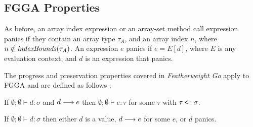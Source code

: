 


\subsection{FGGA Properties}

As before, an array index expression or an array-set method call expression
panics if they contain an array type $\tau_A$, and an array index $n$, where $n
    \notin \mathit{indexBounds}(\tau_A)$. An expression $e$ panics if $e = E[d]$, where $E$ is
any evaluation context, and $d$ is an expression that panics.

The progress and preservation properties covered in \emph{Featherweight Go}
apply to FGGA and are defined as follows \autocite{fg}:

\begin{theorem}[Preservation]
    If\/ $\emptyset;\emptyset \vdash d : \sigma$ and $d \longrightarrow e$
    then\/ $\emptyset;\emptyset \vdash e : \tau$ for some $\tau$
    with\/ $\tau \mathbin{\texttt{<:}} \sigma$.
\end{theorem}

\begin{theorem}[Progress]
    If\/ $\emptyset;\emptyset \vdash d:\sigma$ then
    either\/ $d$ is a value,
    $d \longrightarrow e$ for some $e$,
    or\/ $d$ panics.
\end{theorem}
